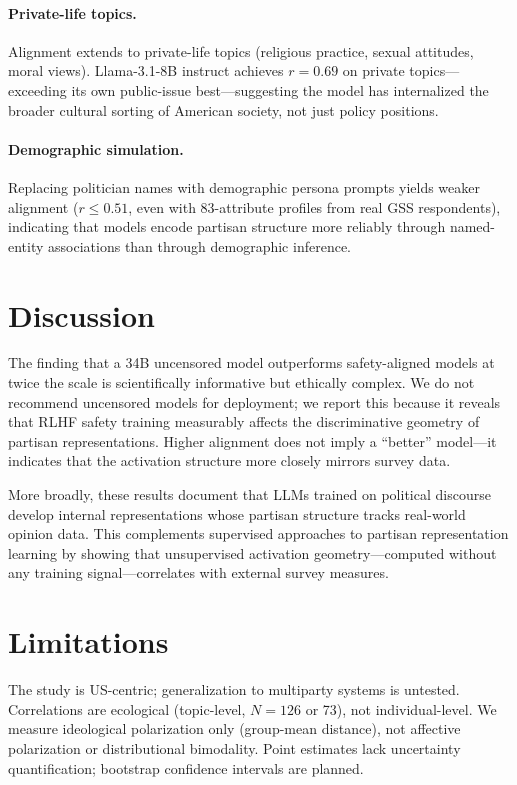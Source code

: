 \documentclass[11pt]{article}
\begin{document}
\paragraph{Private-life topics.} Alignment extends to private-life topics (religious practice, sexual attitudes, moral views). Llama-3.1-8B instruct achieves $r = 0.69$ on private topics---exceeding its own public-issue best---suggesting the model has internalized the broader cultural sorting of American society, not just policy positions.

\paragraph{Demographic simulation.} Replacing politician names with demographic persona prompts yields weaker alignment ($r \leq 0.51$, even with 83-attribute profiles from real GSS respondents), indicating that models encode partisan structure more reliably through named-entity associations than through demographic inference.

\section*{Discussion}

The finding that a 34B uncensored model outperforms safety-aligned models at twice the scale is scientifically informative but ethically complex. We do not recommend uncensored models for deployment; we report this because it reveals that RLHF safety training measurably affects the discriminative geometry of partisan representations. Higher alignment does not imply a ``better'' model---it indicates that the activation structure more closely mirrors survey data.

More broadly, these results document that LLMs trained on political discourse develop internal representations whose partisan structure tracks real-world opinion data. This complements supervised approaches to partisan representation learning \citep{kim2025linear} by showing that unsupervised activation geometry---computed without any training signal---correlates with external survey measures.

\section*{Limitations}

The study is US-centric; generalization to multiparty systems is untested. Correlations are ecological (topic-level, $N = 126$ or 73), not individual-level. We measure ideological polarization only (group-mean distance), not affective polarization or distributional bimodality. Point estimates lack uncertainty quantification; bootstrap confidence intervals are planned.
\end{document}
